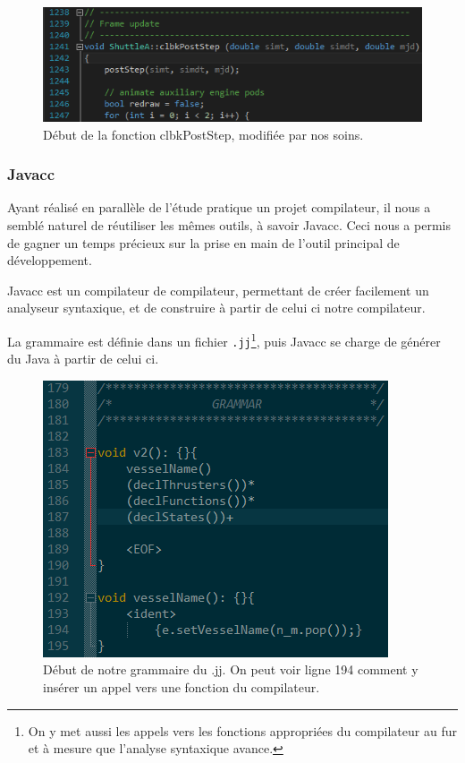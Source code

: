 \documentclass[a4paper,11pt]{article}
\begin{document}
        \begin{figure}[!h]
            \begin{center}
                \includegraphics[width=1\textwidth]{img/post_step.png}
                \caption{Début de la fonction clbkPostStep, modifiée par nos soins.}
            \end{center}
        \end{figure}
        

    \subsubsection{Javacc}
        Ayant réalisé en parallèle de l'étude pratique un projet compilateur, il nous a semblé naturel de réutiliser les mêmes outils, à savoir Javacc. Ceci nous a permis de gagner un temps précieux sur la prise en main de l'outil principal de développement.

        Javacc est un compilateur de compilateur, permettant de créer facilement un analyseur syntaxique, et de construire à partir de celui ci notre compilateur.
        
        La grammaire est définie dans un fichier \verb|.jj|\footnote{On y met aussi les appels vers les fonctions appropriées du compilateur au fur et à mesure que l'analyse syntaxique avance.}, puis Javacc se charge de générer du Java à partir de celui ci.
        
        \begin{figure}[!h]
            \begin{center}
                \includegraphics{img/grammar_jj.png}
                \caption{Début de notre grammaire du .jj. On peut voir ligne 194 comment y insérer un appel vers une fonction du compilateur.}
            \end{center}
        \end{figure}
        
\end{document}
